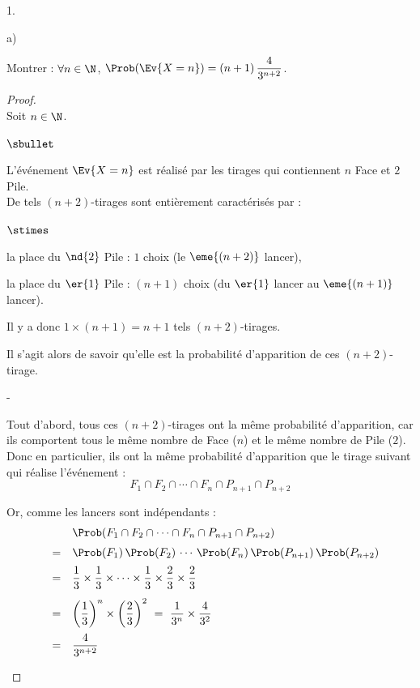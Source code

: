\documentclass[11pt]{article}%
\begin{document}
\begin{noliste}{1.}
\begin{noliste}{a)}
    
    \item Montrer : $\forall n \in \N$, $\Prob(\Ev{X=n}) = (n+1) \,
    \dfrac{4}{3^{n+2}}$.
    
    \begin{proof}~\\
      Soit $n\in \N$.
      \begin{noliste}{$\sbullet$}
	\item L'événement $\Ev{X=n}$ est réalisé par les tirages qui 
	contiennent $n$ Face et $2$ Pile.\\
	De tels $(n+2)$-tirages sont entièrement caractérisés par :
	\begin{noliste}{$\stimes$}
	  \item la place du $\nd{2}$ Pile : $1$ choix (le $\eme{(n+2)}$
	  lancer),
	  \item la place du $\er{1}$ Pile : $(n+1)$ choix (du 
	  $\er{1}$ lancer au $\eme{(n+1)}$ lancer).
	\end{noliste}
	Il y a donc $1 \times (n+1) = n+1$ tels $(n+2)$-tirages.
	
	\item Il s'agit alors de savoir qu'elle est la probabilité 
	d'apparition de ces $(n+2)$-tirage.
	\begin{noliste}{-}
	  \item Tout d'abord, tous ces $(n+2)$-tirages ont la même 
	  probabilité d'apparition, car ils comportent tous le 
	  même nombre de Face ($n$) et le même nombre de Pile ($2$).\\
	  Donc en particulier, ils ont la même probabilité
	  d'apparition que le
	  tirage suivant qui réalise l'événement :
	  \[
	    F_1 \cap F_2 \cap \cdots \cap F_n \cap P_{n+1} \cap 
	    P_{n+2}
	  \]
	  
	  
	  \newpage
	  
	  
	  \item Or, comme les lancers sont indépendants :
	  \[
	    \begin{array}{rcl}
	      & &\Prob(F_1 \cap F_2 \cap \cdots \cap F_n \cap P_{n+1} 
	      \cap P_{n+2})
	      \\[.2cm]
	      & = &  \Prob(F_1) \, \Prob(F_2) \, \cdots \, \Prob(F_n) \, 
	      \Prob(P_{n+1}) \, \Prob(P_{n+2})
	      \\[.2cm]
	      & = &  \dfrac{1}{3} \times \dfrac{1}{3} \times \cdots \times 
	      \dfrac{1}{3} \times \dfrac{2}{3} \times \dfrac{2}{3}
	      \\[.4cm]
	      & = &  \left(\dfrac{1}{3}\right)^n \times \left(
	      \dfrac{2}{3}\right)^2 
	      \ = \ \dfrac{1}{3^n} \times \dfrac{4}{3^2}
	      \\[.4cm]
	      & = &  \dfrac{4}{3^{n+2}}
	    \end{array}
	  \]
	\end{noliste}
      \end{noliste}
      

\end{proof}
\end{noliste}
\end{noliste}
\end{document}
